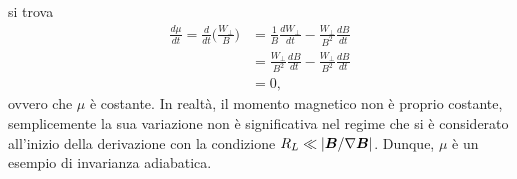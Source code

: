 si trova
\begin{equation}
    \begin{split}
        \frac{d\mu}{dt} = \frac{d}{dt}\bigg(\frac{W_\perp}{B}\bigg) &= \frac{1}{B}\frac{dW_\perp}{dt} - \frac{W_\perp}{B^2}\frac{dB}{dt} \\
        &= \frac{W_\perp}{B^2}\frac{dB}{dt} - \frac{W_\perp}{B^2}\frac{dB}{dt} \\
        &= 0,
    \end{split}
\end{equation}
ovvero che $\mu$ è costante. In realtà, il momento magnetico non è proprio costante, semplicemente la sua variazione non è significativa nel regime che si è considerato all'inizio della derivazione con la condizione $R_L \ll |\bm{B}/\nabla \bm{B}|$. Dunque, $\mu$ è un esempio di invarianza adiabatica. 

